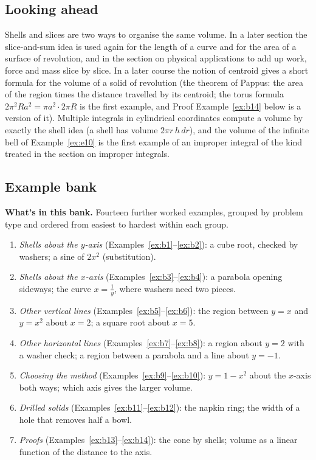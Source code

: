 \documentclass[11pt]{article}
\begin{document}
\subsection*{Looking ahead}

Shells and slices are two ways to organise the same volume. In a later section the slice-and-sum idea is used again for the length of a curve and for the area of a surface of revolution, and in the section on physical applications to add up work, force and mass slice by slice. In a later course the notion of centroid gives a short formula for the volume of a solid of revolution (the theorem of Pappus: the area of the region times the distance travelled by its centroid; the torus formula $2\pi^2Ra^2=\pi a^2\cdot2\pi R$ is the first example, and Proof Example~\ref{ex:b14} below is a version of it). Multiple integrals in cylindrical coordinates compute a volume by exactly the shell idea (a shell has volume $2\pi r\,h\,dr$), and the volume of the infinite bell of Example~\ref{ex:e10} is the first example of an improper integral of the kind treated in the section on improper integrals.


\subsection*{Example bank}

\textbf{What's in this bank.} Fourteen further worked examples, grouped by problem type and ordered from easiest to hardest within each group.
\begin{enumerate}[nosep]
  \item \emph{Shells about the $y$-axis} (Examples~\ref{ex:b1}--\ref{ex:b2}): a cube root, checked by washers; a sine of $2x^2$ (substitution).
  \item \emph{Shells about the $x$-axis} (Examples~\ref{ex:b3}--\ref{ex:b4}): a parabola opening sideways; the curve $x=\frac1y$, where washers need two pieces.
  \item \emph{Other vertical lines} (Examples~\ref{ex:b5}--\ref{ex:b6}): the region between $y=x$ and $y=x^2$ about $x=2$; a square root about $x=5$.
  \item \emph{Other horizontal lines} (Examples~\ref{ex:b7}--\ref{ex:b8}): a region about $y=2$ with a washer check; a region between a parabola and a line about $y=-1$.
  \item \emph{Choosing the method} (Examples~\ref{ex:b9}--\ref{ex:b10}): $y=1-x^2$ about the $x$-axis both ways; which axis gives the larger volume.
  \item \emph{Drilled solids} (Examples~\ref{ex:b11}--\ref{ex:b12}): the napkin ring; the width of a hole that removes half a bowl.
  \item \emph{Proofs} (Examples~\ref{ex:b13}--\ref{ex:b14}): the cone by shells; volume as a linear function of the distance to the axis.
\end{enumerate}
\end{document}
